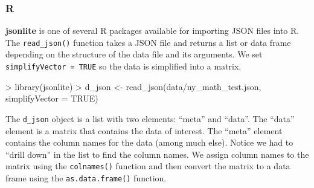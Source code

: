 \documentclass[
]{book}
\newenvironment{Shaded}{\begin{snugshade}}{\end{snugshade}}
\newcommand{\AttributeTok}[1]{\textcolor[rgb]{0.77,0.63,0.00}{#1}}
\newcommand{\ConstantTok}[1]{\textcolor[rgb]{0.00,0.00,0.00}{#1}}
\newcommand{\DecValTok}[1]{\textcolor[rgb]{0.00,0.00,0.81}{#1}}
\newcommand{\FunctionTok}[1]{\textcolor[rgb]{0.00,0.00,0.00}{#1}}
\newcommand{\NormalTok}[1]{#1}
\newcommand{\OtherTok}[1]{\textcolor[rgb]{0.56,0.35,0.01}{#1}}
\newcommand{\SpecialCharTok}[1]{\textcolor[rgb]{0.00,0.00,0.00}{#1}}
\newcommand{\StringTok}[1]{\textcolor[rgb]{0.31,0.60,0.02}{#1}}
\begin{document}
\hypertarget{r-12}{%
\subsubsection*{R}\label{r-12}}

\textbf{jsonlite} is one of several R packages available for importing JSON files into R. The \texttt{read\_json()} function takes a JSON file and returns a list or data frame depending on the structure of the data file and its arguments. We set \texttt{simplifyVector\ =\ TRUE} so the data is simplified into a matrix.

\begin{Shaded}
\begin{Highlighting}[]
\SpecialCharTok{\textgreater{}} \FunctionTok{library}\NormalTok{(jsonlite)}
\SpecialCharTok{\textgreater{}}\NormalTok{ d\_json }\OtherTok{\textless{}{-}} \FunctionTok{read\_json}\NormalTok{(}\StringTok{\textquotesingle{}data/ny\_math\_test.json\textquotesingle{}}\NormalTok{, }\AttributeTok{simplifyVector =} \ConstantTok{TRUE}\NormalTok{)}
\end{Highlighting}
\end{Shaded}

The \texttt{d\_json} object is a list with two elements: ``meta'' and ``data''. The ``data'' element is a matrix that contains the data of interest. The ``meta'' element contains the column names for the data (among much else). Notice we had to ``drill down'' in the list to find the column names. We assign column names to the matrix using the \texttt{colnames()} function and then convert the matrix to a data frame using the \texttt{as.data.frame()} function.

\begin{Shaded}
\end{Shaded}
\end{document}
